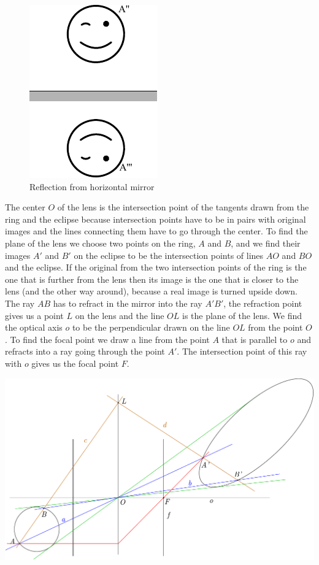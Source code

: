 \documentclass[11pt]{article}
\begin{document}
\begin{figure}[h]
	\centerline{\includegraphics[scale=1.1]{2016-v3g-08-nurgapeegel_j3}}
	\caption{Reflection from horizontal mirror}
\end{figure}
\probend
\bigskip


\solueng
The center $O$ of the lens is the intersection point of the tangents drawn from the ring and the eclipse because intersection points have to be in pairs with original images and the lines connecting them have to go through the center. To find the plane of the lens we choose two points on the ring, $A$ and $B$, and we find their images $A'$ and $B'$ on the eclipse to be the intersection points of lines $AO$ and $BO$ and the eclipse. If the original from the two intersection points of the ring is the one that is further from the lens then its image is the one that is closer to the lens (and the other way around), because a real image is turned upside down. The ray $AB$ has to refract in the mirror into the ray $A'B'$, the refraction point gives us a point $L$ on the lens and the line $OL$ is the plane of the lens. We find the optical axis $o$ to be the perpendicular drawn on the line $OL$ from the point $O$. To find the focal point we draw a line from the point $A$ that is parallel to $o$ and refracts into a ray going through the point $A'$. The intersection point of this ray with $o$ gives us the focal point $F$.
\begin{center}
\includegraphics[width=\textwidth]{2015-v3g-07-ellips_lah}
\end{center}
\probend
\bigskip
\end{document}

